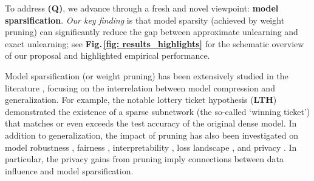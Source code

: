 
To address \textbf{(Q)}, we advance {\MU} through a fresh and novel viewpoint: \textbf{model sparsification}. \textit{Our key finding} is that model sparsity (achieved by weight pruning) can significantly reduce the gap between approximate unlearning and exact unlearning; see \textbf{Fig.\,\ref{fig: results_highlights}} for the schematic overview of our proposal
and  highlighted empirical performance.


Model sparsification (or weight pruning) has been extensively studied   in the literature \cite{han2015deep, chen2021lottery, frankle2018lottery, frankle2020linear, ma2021sanity, zhang2022advancing, blalock2020state}, 
focusing on the interrelation between model compression and generalization.
For example, the notable lottery ticket hypothesis (\textbf{LTH})  \cite{frankle2018lottery} demonstrated 
the existence of a sparse subnetwork (the so-called `winning ticket') that matches or even exceeds the test accuracy of the original dense model. In addition to generalization, the impact of pruning has also been investigated on model robustness \cite{sehwag2020hydra,chen2022quarantine,diffenderfer2021winning}, fairness \cite{stoychev2022effect,xu2022can}, interpretability \cite{wong2021leveraging,chen2022can}, loss landscape \cite{frankle2020linear,chen2022can}, and privacy \cite{huang2020privacy,wang2020against}. In particular, 
the privacy gains from pruning \cite{huang2020privacy,wang2020against} imply connections between data influence and model sparsification.



